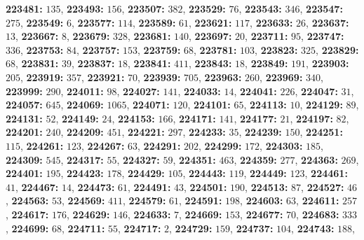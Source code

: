\textsf{\bfseries 223481:} $135$, \textsf{\bfseries 223493:} $156$, \textsf{\bfseries 223507:} $382$, \textsf{\bfseries 223529:} $76$, \textsf{\bfseries 223543:} $346$, \textsf{\bfseries 223547:} $275$, \textsf{\bfseries 223549:} $6$, \textsf{\bfseries 223577:} $114$, \textsf{\bfseries 223589:} $61$, \textsf{\bfseries 223621:} $117$, \textsf{\bfseries 223633:} $26$, \textsf{\bfseries 223637:} $13$, \textsf{\bfseries 223667:} $8$, \textsf{\bfseries 223679:} $328$, \textsf{\bfseries 223681:} $140$, \textsf{\bfseries 223697:} $20$, \textsf{\bfseries 223711:} $95$, \textsf{\bfseries 223747:} $336$, \textsf{\bfseries 223753:} $84$, \textsf{\bfseries 223757:} $153$, \textsf{\bfseries 223759:} $68$, \textsf{\bfseries 223781:} $103$, \textsf{\bfseries 223823:} $325$, \textsf{\bfseries 223829:} $68$, \textsf{\bfseries 223831:} $39$, \textsf{\bfseries 223837:} $18$, \textsf{\bfseries 223841:} $411$, \textsf{\bfseries 223843:} $18$, \textsf{\bfseries 223849:} $191$, \textsf{\bfseries 223903:} $205$, \textsf{\bfseries 223919:} $357$, \textsf{\bfseries 223921:} $70$, \textsf{\bfseries 223939:} $705$, \textsf{\bfseries 223963:} $260$, \textsf{\bfseries 223969:} $340$, \textsf{\bfseries 223999:} $290$, \textsf{\bfseries 224011:} $98$, \textsf{\bfseries 224027:} $141$, \textsf{\bfseries 224033:} $14$, \textsf{\bfseries 224041:} $226$, \textsf{\bfseries 224047:} $31$, \textsf{\bfseries 224057:} $645$, \textsf{\bfseries 224069:} $1065$, \textsf{\bfseries 224071:} $120$, \textsf{\bfseries 224101:} $65$, \textsf{\bfseries 224113:} $10$, \textsf{\bfseries 224129:} $89$, \textsf{\bfseries 224131:} $52$, \textsf{\bfseries 224149:} $24$, \textsf{\bfseries 224153:} $166$, \textsf{\bfseries 224171:} $141$, \textsf{\bfseries 224177:} $21$, \textsf{\bfseries 224197:} $82$, \textsf{\bfseries 224201:} $240$, \textsf{\bfseries 224209:} $451$, \textsf{\bfseries 224221:} $297$, \textsf{\bfseries 224233:} $35$, \textsf{\bfseries 224239:} $150$, \textsf{\bfseries 224251:} $115$, \textsf{\bfseries 224261:} $123$, \textsf{\bfseries 224267:} $63$, \textsf{\bfseries 224291:} $202$, \textsf{\bfseries 224299:} $172$, \textsf{\bfseries 224303:} $185$, \textsf{\bfseries 224309:} $545$, \textsf{\bfseries 224317:} $55$, \textsf{\bfseries 224327:} $59$, \textsf{\bfseries 224351:} $463$, \textsf{\bfseries 224359:} $277$, \textsf{\bfseries 224363:} $269$, \textsf{\bfseries 224401:} $195$, \textsf{\bfseries 224423:} $178$, \textsf{\bfseries 224429:} $105$, \textsf{\bfseries 224443:} $119$, \textsf{\bfseries 224449:} $123$, \textsf{\bfseries 224461:} $41$, \textsf{\bfseries 224467:} $14$, \textsf{\bfseries 224473:} $61$, \textsf{\bfseries 224491:} $43$, \textsf{\bfseries 224501:} $190$, \textsf{\bfseries 224513:} $87$, \textsf{\bfseries 224527:} $46$, \textsf{\bfseries 224563:} $53$, \textsf{\bfseries 224569:} $411$, \textsf{\bfseries 224579:} $61$, \textsf{\bfseries 224591:} $198$, \textsf{\bfseries 224603:} $63$, \textsf{\bfseries 224611:} $257$, \textsf{\bfseries 224617:} $176$, \textsf{\bfseries 224629:} $146$, \textsf{\bfseries 224633:} $7$, \textsf{\bfseries 224669:} $153$, \textsf{\bfseries 224677:} $70$, \textsf{\bfseries 224683:} $333$, \textsf{\bfseries 224699:} $68$, \textsf{\bfseries 224711:} $55$, \textsf{\bfseries 224717:} $2$, \textsf{\bfseries 224729:} $159$, \textsf{\bfseries 224737:} $104$, \textsf{\bfseries 224743:} $188$, 
